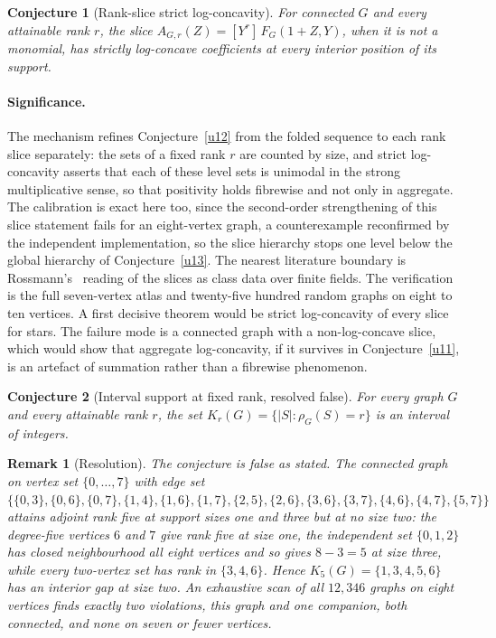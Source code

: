 \documentclass[11pt]{article}
\newtheorem{conjecture}{Conjecture}
\newtheorem{remark}{Remark}
\theoremstyle{definition}
\begin{document}
\begin{conjecture}[Rank-slice strict log-concavity]\label{u14}
For connected $G$ and every attainable rank $r$, the slice $A_{G,r}(Z)=[Y^r]\,F_G(1+Z,Y)$, when it is not a monomial, has strictly log-concave coefficients at every interior position of its support.
\end{conjecture}

\paragraph{Significance.}
The mechanism refines Conjecture~\ref{u12} from the folded sequence to each rank slice separately: the sets of a fixed rank $r$ are counted by size, and strict log-concavity asserts that each of these level sets is unimodal in the strong multiplicative sense, so that positivity holds fibrewise and not only in aggregate.  The calibration is exact here too, since the second-order strengthening of this slice statement fails for an eight-vertex graph, a counterexample reconfirmed by the independent implementation, so the slice hierarchy stops one level below the global hierarchy of Conjecture~\ref{u13}.  The nearest literature boundary is Rossmann's~\cite{Ros22} reading of the slices as class data over finite fields.  The verification is the full seven-vertex atlas and twenty-five hundred random graphs on eight to ten vertices.  A first decisive theorem would be strict log-concavity of every slice for stars.  The failure mode is a connected graph with a non-log-concave slice, which would show that aggregate log-concavity, if it survives in Conjecture~\ref{u11}, is an artefact of summation rather than a fibrewise phenomenon.


\begin{conjecture}[Interval support at fixed rank, resolved false]\label{u15}
For every graph $G$ and every attainable rank $r$, the set $K_r(G)=\{|S|:\rho_G(S)=r\}$ is an interval of integers.
\end{conjecture}

\begin{remark}[Resolution]\label{u15:res}
The conjecture is false as stated.  The connected graph on vertex set $\{0,\ldots,7\}$ with edge set $\{\{0,3\},\{0,6\},\{0,7\},\{1,4\},\{1,6\},\{1,7\},\{2,5\},\{2,6\},\{3,6\},\{3,7\},\{4,6\},\{4,7\},\{5,7\}\}$ attains adjoint rank five at support sizes one and three but at no size two: the degree-five vertices $6$ and $7$ give rank five at size one, the independent set $\{0,1,2\}$ has closed neighbourhood all eight vertices and so gives $8-3=5$ at size three, while every two-vertex set has rank in $\{3,4,6\}$.  Hence $K_5(G)=\{1,3,4,5,6\}$ has an interior gap at size two.  An exhaustive scan of all $12{,}346$ graphs on eight vertices finds exactly two violations, this graph and one companion, both connected, and none on seven or fewer vertices.
\end{remark}
\end{document}
